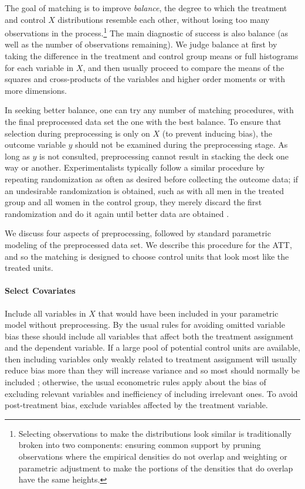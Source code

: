\documentclass[11pt,titlepage]{article}
\begin{document}
The goal of matching is to improve \emph{balance}, the degree to which
the treatment and control $X$ distributions resemble each other,
without losing too many observations in the
process.\footnote{Selecting observations to make the distributions
  look similar is traditionally broken into two components: ensuring
  common support by pruning observations where the empirical densities
  do not overlap and weighting or parametric adjustment to make the
  portions of the densities that do overlap have the same heights.}
The main diagnostic of success is also balance (as well as the number
of observations remaining).  We judge balance at first by taking the
difference in the treatment and control group means or full histograms
for each variable in $X$, and then usually proceed to compare the
means of the squares and cross-products of the variables and higher
order moments or with more dimensions.

In seeking better balance, one can try any number of matching
procedures, with the final preprocessed data set the one with the best
balance.  To ensure that selection during preprocessing is only on $X$
(to prevent inducing bias), the outcome variable $y$ should not be
examined during the preprocessing stage.  As long as $y$ is not
consulted, preprocessing cannot result in stacking the deck one way or
another.  Experimentalists typically follow a similar procedure by
repeating randomization as often as desired before collecting the
outcome data; if an undesirable randomization is obtained, such as
with all men in the treated group and all women in the control group,
they merely discard the first randomization and do it again until
better data are obtained \citep[see][]{Rubin01}.

We discuss four aspects of preprocessing, followed by standard
parametric modeling of the preprocessed data set.  We describe this
procedure for the ATT, and so the matching is designed to choose
control units that look most like the treated units.

\paragraph{Select Covariates}
Include all variables in $X$ that would have been included in your
parametric model without preprocessing.  By the usual rules for
avoiding omitted variable bias these should include all variables that
affect both the treatment assignment and the dependent variable.  If a
large pool of potential control units are available, then including
variables only weakly related to treatment assignment will usually
reduce bias more than they will increase variance and so most should
normally be included \citep{RubTho96, HecIchSmi98}; otherwise, the
usual econometric rules apply about the bias of excluding relevant
variables and inefficiency of including irrelevant ones.  To avoid
post-treatment bias, exclude variables affected by the treatment
variable.
\end{document}
